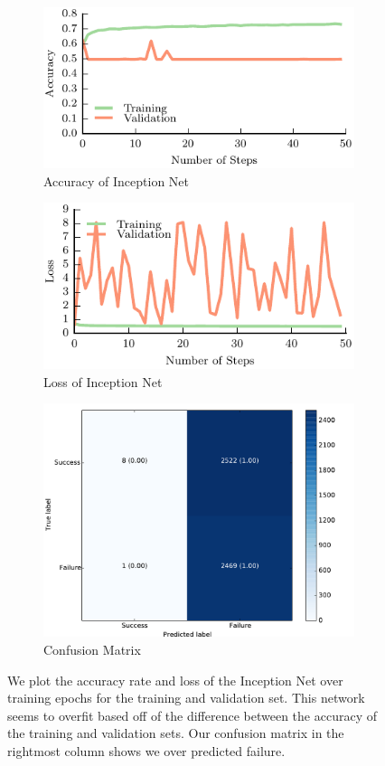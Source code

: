 \begin{figure}[t!]
    \centering
    \begin{subfigure}[t]{0.32\textwidth}
        \includegraphics[width=0.9\columnwidth]{figs/inception_accuracy.pdf}
        \caption{Accuracy of Inception Net} \label{fig:accuracy}
        \end{subfigure}
    \begin{subfigure}[t]{0.32\textwidth}
        \includegraphics[width=0.9\columnwidth]{figs/inception_loss.pdf}
        \caption{Loss of Inception Net} \label{fig:loss_inception}
    \end{subfigure}
		\begin{subfigure}[t]{0.32\textwidth}
        \includegraphics[width=0.8\columnwidth]{figs/confusion_inception.pdf}
        \caption{Confusion Matrix} \label{fig:confusion_inception}
    \end{subfigure}
\caption{We plot the accuracy rate and loss of the Inception Net over training epochs for the training and validation set. This network seems to overfit based off of the difference between the accuracy of the training and validation sets. Our confusion matrix in the rightmost column shows we over predicted failure.} \label{fig:inceptionnet_results}
\end{figure}


